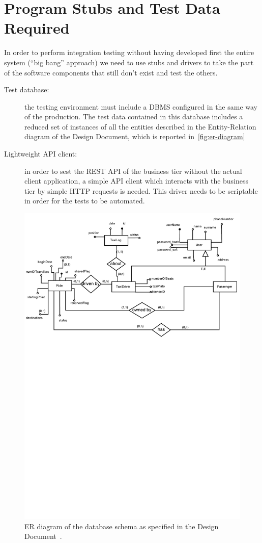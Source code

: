 \chapter{Program Stubs and Test Data Required}
\label{chap:stubs}

In order to perform integration testing without having developed first the entire system (``big bang'' approach) we need to use stubs and drivers to take the part of the software components that still don't exist and test the others.

\begin{description}
    \item[Test database:] the testing environment must include a DBMS configured in the same way of the production. The test data contained in this database includes a reduced set of instances of all the entities described in the Entity-Relation diagram of the Design Document, which is reported in~\autoref{fig:er-diagram}

    \item[Lightweight API client:] in order to sest the REST API of the business tier without the actual client application, a simple API client which interacts with the business tier by simple HTTP requests is needed. This driver needs to be scriptable in order for the tests to be automated.
\end{description}

\begin{figure}
    \centering
    \includegraphics[width=\textwidth]{../dd/diagrams/er_diagram.pdf}
    \caption{ER diagram of the database schema as specified in the Design Document~\cite{mytaxi-dd}.}
    \label{fig:er-diagram}
\end{figure}
